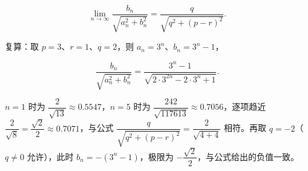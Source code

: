\begin{answer}
\nopagebreak[4]
\[
\lim_{n\to\infty}\frac{b_n}{\sqrt{a_n^2+b_n^2}}
=\frac{q}{\sqrt{q^2+(p-r)^2}}.
\]

复算：取 $p=3$、$r=1$、$q=2$，则 $a_n=3^n$、$b_n=3^n-1$，

\nopagebreak[4]
\[
\frac{b_n}{\sqrt{a_n^2+b_n^2}}=\frac{3^n-1}{\sqrt{2\cdot3^{2n}-2\cdot3^n+1}}.
\]

$n=1$ 时为 $\dfrac{2}{\sqrt{13}}\approx0.5547$，$n=5$ 时为 $\dfrac{242}{\sqrt{117613}}\approx0.7056$，逐项趋近 $\dfrac{2}{\sqrt{8}}=\dfrac{\sqrt2}{2}\approx0.7071$，与公式 $\dfrac{q}{\sqrt{q^2+(p-r)^2}}=\dfrac{2}{\sqrt{4+4}}$ 相符。再取 $q=-2$（$q\ne0$ 允许），此时 $b_n=-(3^n-1)$，极限为 $-\dfrac{\sqrt2}{2}$，与公式给出的负值一致。


\end{answer}